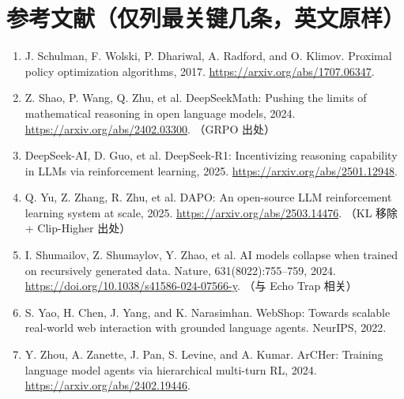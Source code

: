 \documentclass[11pt,UTF8,fontset=fandol]{ctexart}
\begin{document}
\section*{参考文献（仅列最关键几条，英文原样）}
\begin{enumerate}[leftmargin=2em,itemsep=1pt]
\item J. Schulman, F. Wolski, P. Dhariwal, A. Radford, and O. Klimov. Proximal policy optimization algorithms, 2017. \url{https://arxiv.org/abs/1707.06347}.
\item Z. Shao, P. Wang, Q. Zhu, et al. DeepSeekMath: Pushing the limits of mathematical reasoning in open language models, 2024. \url{https://arxiv.org/abs/2402.03300}. （GRPO 出处）
\item DeepSeek-AI, D. Guo, et al. DeepSeek-R1: Incentivizing reasoning capability in LLMs via reinforcement learning, 2025. \url{https://arxiv.org/abs/2501.12948}.
\item Q. Yu, Z. Zhang, R. Zhu, et al. DAPO: An open-source LLM reinforcement learning system at scale, 2025. \url{https://arxiv.org/abs/2503.14476}. （KL 移除 + Clip-Higher 出处）
\item I. Shumailov, Z. Shumaylov, Y. Zhao, et al. AI models collapse when trained on recursively generated data. Nature, 631(8022):755--759, 2024. \url{https://doi.org/10.1038/s41586-024-07566-y}. （与 Echo Trap 相关）
\item S. Yao, H. Chen, J. Yang, and K. Narasimhan. WebShop: Towards scalable real-world web interaction with grounded language agents. NeurIPS, 2022.
\item Y. Zhou, A. Zanette, J. Pan, S. Levine, and A. Kumar. ArCHer: Training language model agents via hierarchical multi-turn RL, 2024. \url{https://arxiv.org/abs/2402.19446}.
\end{enumerate}
\end{document}
